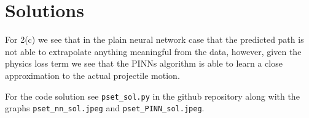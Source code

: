 \documentclass{article}
\begin{document}
\section{Solutions}

For 2(c) we see that in the plain neural network case that the predicted path is not able to extrapolate anything meaningful from the data, however, given the physics loss term we see that the PINNs algorithm is able to learn a close approximation to the actual projectile motion.

For the code solution see \texttt{pset\_sol.py} in the github repository along with the graphs \texttt{pset\_nn\_sol.jpeg} and \texttt{pset\_PINN\_sol.jpeg}.
\end{document}
